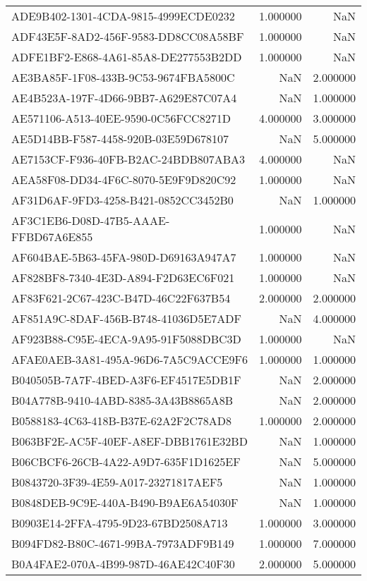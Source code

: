 \begin{tabular}{lrr}
ADE9B402-1301-4CDA-9815-4999ECDE0232 & 1.000000 & NaN \\
ADF43E5F-8AD2-456F-9583-DD8CC08A58BF & 1.000000 & NaN \\
ADFE1BF2-E868-4A61-85A8-DE277553B2DD & 1.000000 & NaN \\
AE3BA85F-1F08-433B-9C53-9674FBA5800C & NaN & 2.000000 \\
AE4B523A-197F-4D66-9BB7-A629E87C07A4 & NaN & 1.000000 \\
AE571106-A513-40EE-9590-0C56FCC8271D & 4.000000 & 3.000000 \\
AE5D14BB-F587-4458-920B-03E59D678107 & NaN & 5.000000 \\
AE7153CF-F936-40FB-B2AC-24BDB807ABA3 & 4.000000 & NaN \\
AEA58F08-DD34-4F6C-8070-5E9F9D820C92 & 1.000000 & NaN \\
AF31D6AF-9FD3-4258-B421-0852CC3452B0 & NaN & 1.000000 \\
AF3C1EB6-D08D-47B5-AAAE-FFBD67A6E855 & 1.000000 & NaN \\
AF604BAE-5B63-45FA-980D-D69163A947A7 & 1.000000 & NaN \\
AF828BF8-7340-4E3D-A894-F2D63EC6F021 & 1.000000 & NaN \\
AF83F621-2C67-423C-B47D-46C22F637B54 & 2.000000 & 2.000000 \\
AF851A9C-8DAF-456B-B748-41036D5E7ADF & NaN & 4.000000 \\
AF923B88-C95E-4ECA-9A95-91F5088DBC3D & 1.000000 & NaN \\
AFAE0AEB-3A81-495A-96D6-7A5C9ACCE9F6 & 1.000000 & 1.000000 \\
B040505B-7A7F-4BED-A3F6-EF4517E5DB1F & NaN & 2.000000 \\
B04A778B-9410-4ABD-8385-3A43B8865A8B & NaN & 2.000000 \\
B0588183-4C63-418B-B37E-62A2F2C78AD8 & 1.000000 & 2.000000 \\
B063BF2E-AC5F-40EF-A8EF-DBB1761E32BD & NaN & 1.000000 \\
B06CBCF6-26CB-4A22-A9D7-635F1D1625EF & NaN & 5.000000 \\
B0843720-3F39-4E59-A017-23271817AEF5 & NaN & 1.000000 \\
B0848DEB-9C9E-440A-B490-B9AE6A54030F & NaN & 1.000000 \\
B0903E14-2FFA-4795-9D23-67BD2508A713 & 1.000000 & 3.000000 \\
B094FD82-B80C-4671-99BA-7973ADF9B149 & 1.000000 & 7.000000 \\
B0A4FAE2-070A-4B99-987D-46AE42C40F30 & 2.000000 & 5.000000 \\

\end{tabular}
